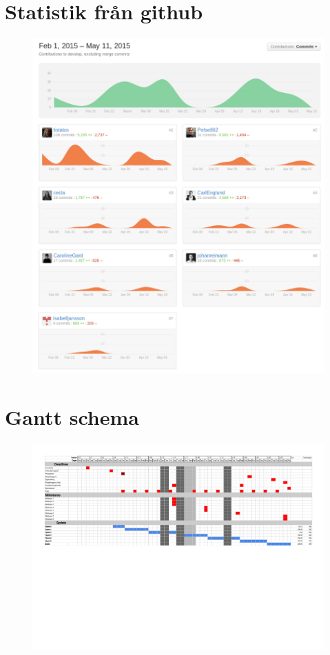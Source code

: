 \documentclass[a4paper,12pt,oneside,final]{extbook}
\begin{document}
\chapter{Statistik från github}
\begin{figure}[h]
  \centering
  \includegraphics[scale=0.4]{bilder/gitstats.png}
  \label{fig:gitstats}
\end{figure}

\newpage
\chapter{Gantt schema}\label{app:gantt}
\begin{figure}[h]
\includegraphics[angle=270,origin=c,scale=0.62]{Ganttschema.pdf}
\end{figure}
\end{document}
